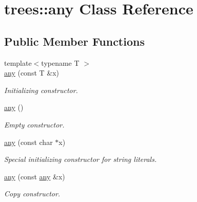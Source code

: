 \hypertarget{classtrees_1_1any}{}\section{trees\+:\+:any Class Reference}
\label{classtrees_1_1any}
\subsection*{Public Member Functions}
\begin{DoxyCompactItemize}
\item 
\mbox{\label{classtrees_1_1any_aefa1aa3506f41de586a32b53ba86433a}} 
{\footnotesize template$<$typename T $>$ }\\\hyperlink{classtrees_1_1any_aefa1aa3506f41de586a32b53ba86433a}{any} (const T \&x)
\begin{DoxyCompactList}\small\item\em Initializing constructor. \end{DoxyCompactList}\item 
\mbox{\label{classtrees_1_1any_a1427bfdf982490592ad0589bd16e9873}} 
\hyperlink{classtrees_1_1any_a1427bfdf982490592ad0589bd16e9873}{any} ()
\begin{DoxyCompactList}\small\item\em Empty constructor. \end{DoxyCompactList}\item 
\mbox{\label{classtrees_1_1any_a8a2c5b0086567feb4d357de24ae3130a}} 
\hyperlink{classtrees_1_1any_a8a2c5b0086567feb4d357de24ae3130a}{any} (const char $\ast$x)
\begin{DoxyCompactList}\small\item\em Special initializing constructor for string literals. \end{DoxyCompactList}\item 
\mbox{\label{classtrees_1_1any_a453ddedfa9deb74a3a223dfec759d346}} 
\hyperlink{classtrees_1_1any_a453ddedfa9deb74a3a223dfec759d346}{any} (const \hyperlink{classtrees_1_1any}{any} \&x)
\begin{DoxyCompactList}\small\item\em Copy constructor. \end{DoxyCompactList}\item 

\end{DoxyCompactItemize}
